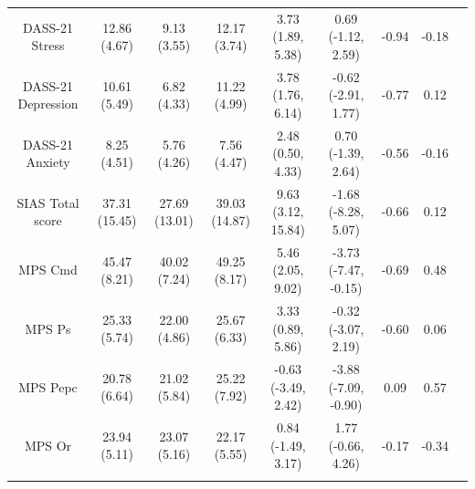 \documentclass[
  man,floatsintext]{apa6}
\begin{document}
\begin{landscape}
\begin{longtable}{@{\extracolsep{\fill}} cc cc cc cc c}
    DASS-21 Stress    &   12.86 (4.67)  &   9.13 (3.55)  &   12.17 (3.74)   &   3.73 (1.89, 5.38)  &   0.69 (-1.12, 2.59)  &   -0.94   &   -0.18   \\  
                                                                                                               
    DASS-21 Depression    &   10.61 (5.49)  &   6.82 (4.33)   &   11.22 (4.99)   &  3.78 (1.76, 6.14)  &  -0.62 (-2.91, 1.77)   &   -0.77    &  0.12 \\  
                                                                                       
    DASS-21 Anxiety    &  8.25 (4.51)  &   5.76 (4.26)    &  7.56 (4.47)  &   2.48 (0.50, 4.33)   &   0.70 (-1.39, 2.64) &   -0.56   &   -0.16   \\  
                                                                                                               
    SIAS Total score   &   37.31 (15.45)   &   27.69 (13.01)   &  39.03 (14.87)    &   9.63 (3.12, 15.84)   &   -1.68 (-8.28, 5.07)   &  -0.66    &   0.12    \\  
                                                                                                                   
    MPS Cmd    &   45.47 (8.21)   &   40.02 (7.24) &   49.25 (8.17) &   5.46 (2.05, 9.02)  &    -3.73 (-7.47, -0.15)  &  -0.69   &   0.48   \\  
                                                                                                                   
    MPS Ps   &  25.33 (5.74)   &   22.00 (4.86)   &   25.67 (6.33)   &   3.33 (0.89, 5.86)      &  -0.32 (-3.07, 2.19)  &   -0.60  &   0.06  \\  
                                                                                                                   
    MPS Pepc  &   20.78 (6.64) &   21.02 (5.84) &  25.22 (7.92)  &   -0.63 (-3.49, 2.42)    &   -3.88 (-7.09, -0.90)  &   0.09    &   0.57  \\
                                                                                                                   
    MPS Or   &   23.94 (5.11)   &  23.07 (5.16)  &   22.17  (5.55)  &   0.84 (-1.49, 3.17)   &   1.77 (-0.66, 4.26)
    &   -0.17    &   -0.34   \\  
                                                                                                     
    &               &               &                   &   \textbf{}               &               &        \\ \hline\hline
   
\end{longtable}

\end{landscape}
\end{document}
